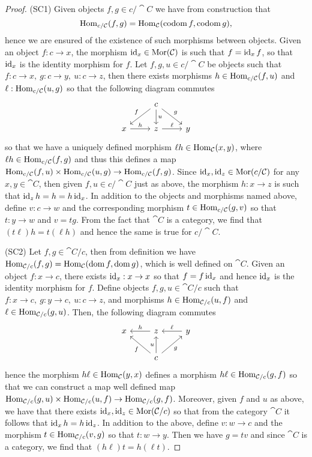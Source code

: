 \begin{proof}
  (SC1) Given objects \(f, g \in c/\cat C\) we have from construction that
  \[
    \operatorname{Hom}_{c/\mathcal C}(f, g) = \operatorname{Hom}_{\mathcal C}(\operatorname{codom} f, \operatorname{codom} g),
  \]
  hence we are
  ensured of the existence of such morphisms between objects. Given an object
  \(f: c \to x\), the morphism \(\operatorname{id}_x \in \operatorname{Mor}(\mathcal C)\) is such that \(f =
  \operatorname{id}_x  f\), so that \(\operatorname{id}_x\) is the identity morphism for \(f\). Let
  \(f, g, u \in c/\cat C\) be objects such that \(f: c \to x,\ g: c \to y,\ u: c
  \to z\), then there exists morphisms \(h \in \operatorname{Hom}_{c/\mathcal C}(f, u)\) and
  \(\ell: \operatorname{Hom}_{c/\mathcal C}(u, g)\) so that the following diagram commutes
  \[
    \begin{tikzcd}
        &c \ar[dl, swap, "f"] \ar[d, "u"] \ar[dr, "g"] & \\
      x \ar[r, "h"]
        &z \ar[r, "\ell"]
          &y
    \end{tikzcd}
  \]
  so that we have a uniquely defined morphism \(\ell  h \in \operatorname{Hom}_{\mathcal
  C}(x, y)\), where \(\ell  h \in \operatorname{Hom}_{c/\mathcal C}(f, g)\) and
  thus this defines a map \(\operatorname{Hom}_{c/\mathcal C}(f, u) \times \operatorname{Hom}_{c/\mathcal C}(u, g)
  \to \operatorname{Hom}_{c/\mathcal C}(f, g)\). Since \(\operatorname{id}_x, \operatorname{id}_z \in \operatorname{Mor}(c/\mathcal C)\) for any
  \(x, y \in \cat C\), then given \(f, u \in c/\cat C\) just as above, the
  morphism \(h: x \to z\) is such that \(\operatorname{id}_z  h = h = h  \operatorname{id}_x\). In
  addition to the objects and morphisms named above, define \(v: c \to w\) and
  the corresponding morphism \(t \in \operatorname{Hom}_{c/\mathcal C}(g, v)\) so that \(t: y \to
  w\) and \(v = t  g\). From the fact that \(\cat C\) is a category, we
  find that \((t  \ell)  h = t  (\ell  h)\) and hence the
  same is true for \(c/\cat C\).

  (SC2) Let \(f, g \in \cat C/c\), then from definition we have \(\operatorname{Hom}_{\mathcal
  C/c}(f, g) = \operatorname{Hom}_{\mathcal C}(\operatorname{dom} f, \operatorname{dom} g)\), which is well defined on \(\cat
  C\). Given an object \(f: x \to c\), there exists \(\operatorname{id}_x: x \to x\) so that
  \(f = f  \operatorname{id}_x\) and hence \(\operatorname{id}_x\) is the identity morphism for \(f\).
  Define objects \(f, g, u \in \cat C/c\) such that \(f: x \to c,\ g: y \to c,\
  u: c \to z\), and morphisms \(h \in \operatorname{Hom}_{\mathcal C/c}(u, f)\) and \(\ell \in
  \operatorname{Hom}_{\mathcal C/c}(g, u)\). Then, the following diagram commutes
   \[
    \begin{tikzcd}
      x
        &z \ar[l, swap, "h"]
          &y \ar[l, swap, "\ell"] \\
        &c \ar[lu, "f"] \ar[u, "u"] \ar[ru, swap, "g"]
    \end{tikzcd}
  \]
  hence the morphism \(h  \ell \in \operatorname{Hom}_{\mathcal C}(y, x)\) defines a morphism
  \(h  \ell \in \operatorname{Hom}_{\mathcal C/c}(g, f)\) so that we can construct a map well
  defined map \(\operatorname{Hom}_{\mathcal C/c}(g, u) \times \operatorname{Hom}_{\mathcal C/c}(u, f) \to
  \operatorname{Hom}_{\mathcal C/c}(g, f)\). Moreover, given \(f\) and \(u\) as above, we have
  that there exists \(\operatorname{id}_x, \operatorname{id}_z \in \operatorname{Mor}(\mathcal C/c)\) so that from the
  category \(\cat C\) it follows that \(\operatorname{id}_x  h = h  \operatorname{id}_z\). In
  addition to the above, define \(v: w \to c\) and the morphism \(t \in
  \operatorname{Hom}_{\mathcal C/c}(v, g)\) so that \(t: w \to y\). Then we have \(g = t  v\)
  and since \(\cat C\) is a category, we find that \((h  \ell)  t = h
   (\ell  t)\).
\end{proof}
